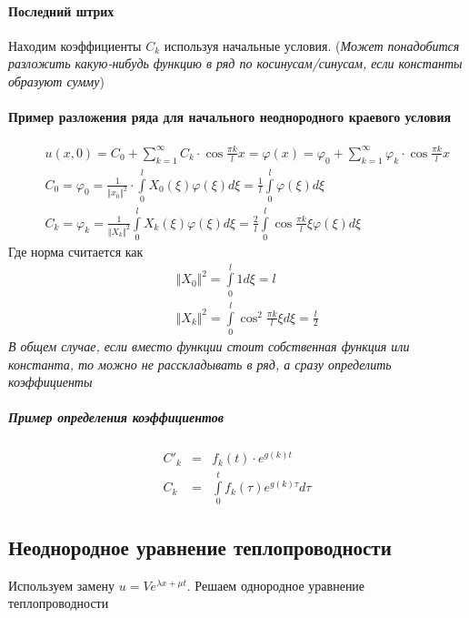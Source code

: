 \documentclass{article}[12pt]
\begin{document}
\paragraph{Последний штрих}
Находим коэффициенты $C_{k}$ используя начальные условия.
(\textit{Может понадобится разложить какую-нибудь функцию в ряд по
косинусам/синусам, если константы образуют сумму})
\paragraph{Пример разложения ряда для начального неоднородного краевого условия}
\begin{eqnarray*}
    &&u(x,0)=C_{0}+\sum\limits_{k=1}^{\infty}C_{k}\cdot\cos{\frac{\pi
    k}{l}}x
    =\varphi(x)=\varphi_{0}+\sum\limits_{k=1}^{\infty}\varphi_{k}
    \cdot\cos{\frac{\pi k}{l}}x  \\
    &&C_{0}=\varphi_{0}=\frac{1}{\Vert x_{0}\Vert^{2}}
    \cdot \int\limits_{0}^{l}X_{0}(\xi)\varphi(\xi)d\xi
    =\frac{1}{l}\int\limits_{0}^{l}\varphi(\xi)d\xi\\
    &&C_{k}=\varphi_{k}=\frac{1}{\Vert X_{k}
    \Vert^{2}}\int\limits_{0}^{l}X_{k}(\xi)\varphi(\xi)d\xi
    =\frac{2}{l}\int\limits_{0}^{l}\cos{\frac{\pi
    k}{l}\xi}\varphi(\xi)d\xi
\end{eqnarray*}
Где норма считается как
\begin{eqnarray*}
    &&\Vert X_{0} \Vert^{2}
    =\int\limits_{0}^{l}1d\xi=l\\
    &&\Vert X_{k} \Vert^{2}
    =\int\limits_{0}^{l}\cos^{2}{\frac{\pi k}{l}}\xi d\xi =\frac{l}{2}
\end{eqnarray*}
\textit{В общем случае, если вместо функции стоит собственная функция
или константа, то можно не расскладывать в ряд, а сразу определить
коэффициенты}


\subparagraph{Пример определения коэффициентов}
\begin{eqnarray*}
    C'_{k} & = & f_{k}(t)\cdot e^{g(k)t}\\
    C_{k} & = & \int\limits_{0}^{t}f_{k}(\tau)e^{g(k)\tau}d\tau
\end{eqnarray*}


\subsection{Неоднородное уравнение теплопроводности}
Используем замену $u=Ve^{\lambda x+\mu t}$. Решаем однородное уравнение
теплопроводности
\end{document}
